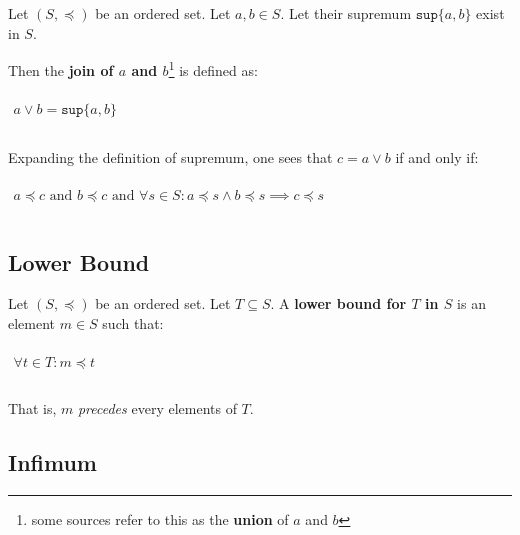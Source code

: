 Let $(S, \preceq)$ be an ordered set. Let $a, b \in S$. Let their
supremum $\mathtt{sup} \{a, b\}$ exist in $S$.

Then the \textbf{join of $a$ and $b$}\footnote{some sources refer to
  this as the \textbf{union} of $a$ and $b$} is defined as:

\begin{math}
  \begin{array}{c}
    \\
    a \vee b = \mathtt{sup} \{ a, b \}\\
    \\
  \end{array}
\end{math}

Expanding the definition of supremum, one sees that $c = a \vee b$ if
and only if:

\begin{math}
  \begin{array}{c}
    \\
    a \preceq c\text{ and }b \preceq c\text{ and }\forall s \in S: a \preceq s \land b \preceq s \implies c \preceq s\\
    \\
  \end{array}
\end{math}



\subsection{Lower Bound}
\label{sec:lower-bound}

Let $(S, \preceq)$ be an ordered set. Let $T \subseteq S$. A
\textbf{lower bound for $T$ in $S$} is an element $m \in S$ such that:

\begin{math}
  \begin{array}{c}
    \\
    \forall t \in T: m \preceq t\\
    \\
  \end{array}
\end{math}

That is, $m$ \textit{precedes} every elements of $T$.


\subsection{Infimum}
\label{sec:infimum}

